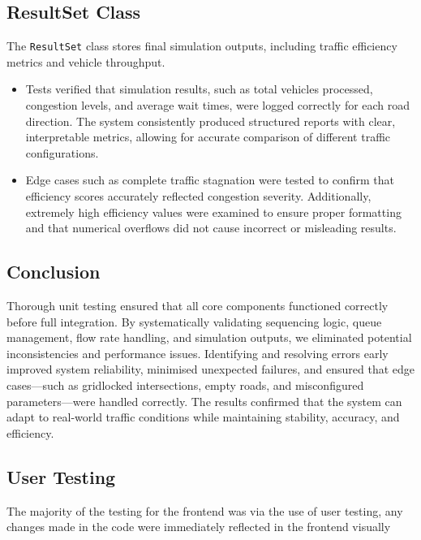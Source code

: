 \documentclass{article}
\begin{document}
    \subsection*{ResultSet Class}
    The \texttt{ResultSet} class stores final simulation outputs, including traffic efficiency metrics and vehicle throughput.
    \begin{itemize}
        \item Tests verified that simulation results, such as total vehicles processed, congestion levels, and average wait times, were logged correctly for each road direction. The system consistently produced structured reports with clear, interpretable metrics, allowing for accurate comparison of different traffic configurations.
        \item Edge cases such as complete traffic stagnation were tested to confirm that efficiency scores accurately reflected congestion severity. Additionally, extremely high efficiency values were examined to ensure proper formatting and that numerical overflows did not cause incorrect or misleading results.
    \end{itemize}

    \subsection*{Conclusion}
    Thorough unit testing ensured that all core components functioned correctly before full integration. By systematically validating sequencing logic, queue management, flow rate handling, and simulation outputs, we eliminated potential inconsistencies and performance issues. Identifying and resolving errors early improved system reliability, minimised unexpected failures, and ensured that edge cases—such as gridlocked intersections, empty roads, and misconfigured parameters—were handled correctly. The results confirmed that the system can adapt to real-world traffic conditions while maintaining stability, accuracy, and efficiency.

    \subsection{User Testing}

    The majority of the testing for the frontend was via the use of user testing, any changes made in the code were immediately
    reflected in the frontend visually
\end{document}
